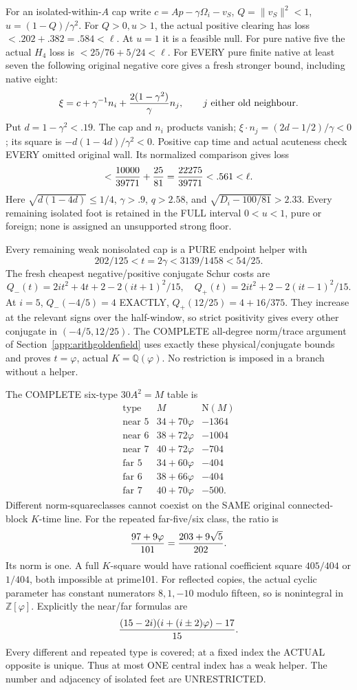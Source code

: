 For an isolated-within-\(A\) cap write
\(c=Ap-\gamma\Omega_i-v_S\),
\(Q=\|v_S\|^2<1\), \(u=(1-Q)/\gamma^2\).
For \(Q>0,u>1\), the actual positive clearing
has loss \(<.202+.382=.584<\ell\).
At \(u=1\) it is a feasible null.
For pure native five the actual \(H_4\)
loss is \(<25/76+5/24<\ell\).
For EVERY pure finite native at least seven
the following original negative core gives
a fresh stronger bound, including native eight:
\[
 \xi=c+\gamma^{-1}n_i+
                    {2(1-\gamma^2)\over\gamma}n_j,
 \qquad j\text{ either old neighbour}.
\]
Put \(d=1-\gamma^2<.19\).
The cap and \(n_i\) products vanish;
\(\xi\cdot n_j=(2d-1/2)/\gamma<0\);
its square is \(-d(1-4d)/\gamma^2<0\).
Positive cap time and actual acuteness check
EVERY omitted original wall.
Its normalized comparison gives loss
\[
 <{10000\over39771}+{25\over81}
       ={22275\over39771}<.561<\ell .
\]
Here \(\sqrt{d(1-4d)}\le1/4\),
\(\gamma>.9\), \(q>2.58\), and
\(\sqrt{D_i-100/81}>2.33\).
Every remaining isolated foot is retained in
the FULL interval \(0<u<1\), pure or foreign;
none is assigned an unsupported strong floor.

Every remaining weak nonisolated cap is a PURE
endpoint helper with
\[
 202/125<t=2\gamma<3139/1458<54/25.
\]
The fresh cheapest negative/positive conjugate
Schur costs are
\[
 Q_-(t)=2it^2+4t+2-2(it+1)^2/15,\quad
 Q_+(t)=2it^2+2-2(it-1)^2/15 .
\]
At \(i=5\), \(Q_-(-4/5)=4\) EXACTLY,
\(Q_+(12/25)=4+16/375\).
They increase at the relevant signs over the
half-window, so strict positivity gives every
other conjugate in \((-4/5,12/25)\).
The COMPLETE all-degree norm/trace argument
of Section~\ref{app:arithgoldenfield} uses exactly
these physical/conjugate bounds and proves
\(t=\varphi\), actual \(K=\mathbb Q(\varphi)\).
No restriction is imposed in a branch without
a helper.

The COMPLETE six-type \(30A^2=M\) table is
\[
\begin{array}{c|c|r}
 \text{type}&M&\mathrm N(M)\\ \hline
 \text{near }5&34+70\varphi&-1364\\
 \text{near }6&38+72\varphi&-1004\\
 \text{near }7&40+72\varphi&-704\\
 \text{far }5&34+60\varphi&-404\\
 \text{far }6&38+66\varphi&-404\\
 \text{far }7&40+70\varphi&-500 .
\end{array}
\]
Different norm-squareclasses cannot coexist on
the SAME original connected-block \(K\)-time line.
For the repeated far-five/six class, the ratio is
\[
                         {97+9\varphi\over101}
                              ={203+9\sqrt5\over202}.
\]
Its norm is one.
A full \(K\)-square would have rational
coefficient square \(405/404\) or \(1/404\),
both impossible at prime101.
For reflected copies, the actual cyclic parameter
has constant numerators \(8,1,-10\) modulo fifteen,
so is nonintegral in \(\mathbb Z[\varphi]\).
Explicitly the near/far formulas are
\[
 { (15-2i)(i+(i\pm2)\varphi)-17\over15}.
\]
Every different and repeated type is covered;
at a fixed index the ACTUAL opposite is unique.
Thus at most ONE central index has a weak helper.
The number and adjacency of isolated feet are
UNRESTRICTED.

